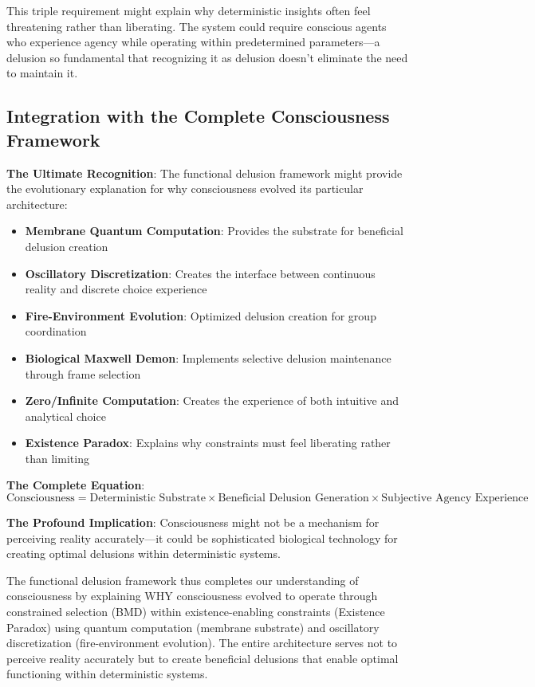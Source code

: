 \documentclass[12pt]{article}
\begin{document}
This triple requirement might explain why deterministic insights often feel threatening rather than liberating. The system could require conscious agents who experience agency while operating within predetermined parameters—a delusion so fundamental that recognizing it as delusion doesn't eliminate the need to maintain it.

\subsection{Integration with the Complete Consciousness Framework}

\textbf{The Ultimate Recognition}: The functional delusion framework might provide the evolutionary explanation for why consciousness evolved its particular architecture:

\begin{itemize}
\item \textbf{Membrane Quantum Computation}: Provides the substrate for beneficial delusion creation
\item \textbf{Oscillatory Discretization}: Creates the interface between continuous reality and discrete choice experience
\item \textbf{Fire-Environment Evolution}: Optimized delusion creation for group coordination
\item \textbf{Biological Maxwell Demon}: Implements selective delusion maintenance through frame selection
\item \textbf{Zero/Infinite Computation}: Creates the experience of both intuitive and analytical choice
\item \textbf{Existence Paradox}: Explains why constraints must feel liberating rather than limiting
\end{itemize}

\textbf{The Complete Equation}:
$$\text{Consciousness} = \text{Deterministic Substrate} \times \text{Beneficial Delusion Generation} \times \text{Subjective Agency Experience}$$

\textbf{The Profound Implication}: Consciousness might not be a mechanism for perceiving reality accurately—it could be sophisticated biological technology for creating optimal delusions within deterministic systems.

The functional delusion framework thus completes our understanding of consciousness by explaining WHY consciousness evolved to operate through constrained selection (BMD) within existence-enabling constraints (Existence Paradox) using quantum computation (membrane substrate) and oscillatory discretization (fire-environment evolution). The entire architecture serves not to perceive reality accurately but to create beneficial delusions that enable optimal functioning within deterministic systems.
\end{document}
